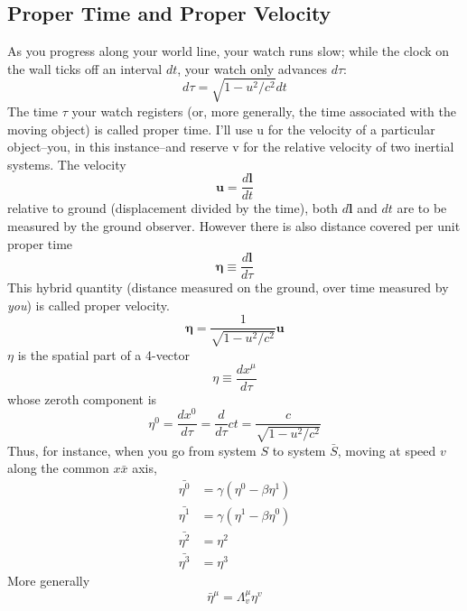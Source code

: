 \documentclass[../../../main.tex]{subfiles}
\begin{document}
\subsection{Proper Time and Proper Velocity}
As you progress along your world line, your watch runs slow; while the clock on the wall ticks off an interval $dt$, your watch only advances $d\tau$:
\begin{equation*}
    d\tau=\sqrt{1 - u^2/c^2}dt
\end{equation*}
The time $\tau$ your watch registers (or, more generally, the time associated with the moving object) is called proper time. I'll use u for the velocity of a particular object--you, in this instance--and reserve v for the relative velocity of two inertial systems.  The velocity
\begin{equation*}
    \mathbf{u}=\frac{d\mathbf{l}}{dt}
\end{equation*}
relative to ground (displacement divided by the time), both $d\mathbf{l}$ and $dt$ are to be measured by the ground observer.  However there is also distance covered per unit proper time
\begin{equation*}
    \boldsymbol{\eta}\equiv \frac{d\mathbf{l}}{d\tau}
\end{equation*}
This hybrid quantity (distance measured on the ground, over time measured by \emph{you}) is called proper velocity. 
\begin{equation*}
    \boldsymbol{\eta}= \frac{1}{\sqrt{1 - u^2/c^2}}\mathbf{u}
\end{equation*}
$\eta$ is the spatial part of a 4-vector
\begin{equation*}
    \eta\equiv\frac{dx^{\mu}}{d\tau}
\end{equation*}
whose zeroth component is
\begin{equation*}
    \eta^0=\frac{dx^{0}}{d\tau}=\frac{d}{d\tau}ct=\frac{c}{\sqrt{1 - u^2/c^2}}
\end{equation*}
Thus, for instance, when you go from system $S$ to system $\bar{S}$, moving at speed $v$ along the common $x\bar{x}$ axis,
\begin{align*}
    \bar{\eta^0} &= \gamma (\eta^0 - \beta \eta^1)\\
    \bar{\eta^1} &= \gamma(\eta^1-\beta \eta^0)\\
    \bar{\eta^2} &=\eta^2\\
    \bar{\eta^3}&=\eta^3
\end{align*}
More generally
\begin{equation*}
    \bar{\eta}^{\mu}=\Lambda_{v}^{\mu}\eta^v
\end{equation*}
\end{document}
